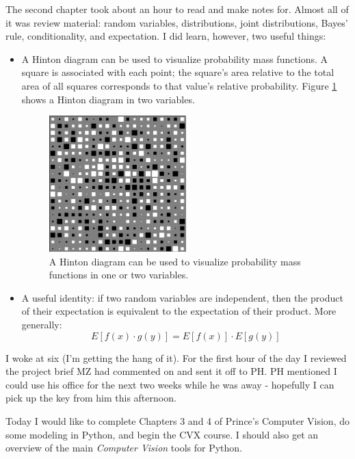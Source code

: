 \documentclass[idxtotoc,hyperref,openany]{labbook} %
\begin{document}
The second chapter took about an hour to read and make notes for. Almost all of it was review material: random variables, distributions, joint distributions, Bayes' rule, conditionality, and expectation. I did learn, however, two useful things:
\begin{itemize}
\item A Hinton diagram can be used to visualize probability mass functions. A square is associated with each point; the square's area relative to the total area of all squares corresponds to that value's relative probability. Figure \ref{fig:hinton_diagram} shows a Hinton diagram in two variables.
\begin{figure}[h!]
\centering
\includegraphics[width=0.5\textwidth]{hinton_diagram.png}
\caption{A Hinton diagram can be used to visualize probability mass functions in one or two variables.}
\label{fig:hinton_diagram}
\end{figure}
\item A useful identity: if two random variables are independent, then the product of their expectation is equivalent to the expectation of their product. More generally:
\begin{equation}
	E[f(x) \cdot g(y)] = E[f(x)] \cdot E[g(y)]
\end{equation}
\end{itemize}



I woke at six (I'm getting the hang of it). For the first hour of the day I reviewed the project brief MZ had commented on and sent it off to PH. PH mentioned I could use his office for the next two weeks while he was away - hopefully I can pick up the key from him this afternoon.

Today I would like to complete Chapters 3 and 4 of Prince's Computer Vision, do some modeling in Python, and begin the CVX course. I should also get an overview of the main \emph{Computer Vision} tools for Python.
\end{document}
